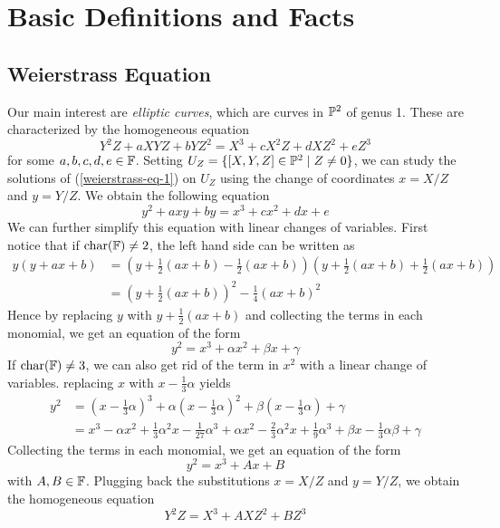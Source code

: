 \section{Basic Definitions and Facts}

\subsection{Weierstrass Equation}

Our main interest are \emph{elliptic curves}, which are curves
in $\mathbb{P}^2$ of genus 1. These are characterized by the
homogeneous equation
\begin{equation}
	\label{weierstrass-eq-1}
	Y^2Z + aXYZ + bYZ^2 = X^3 + cX^2Z + dXZ^2 + eZ^3
\end{equation}
for some $a, b, c, d, e \in \mathbb{F}$.
Setting $U_Z = \{[X, Y, Z] \in \mathbb{P}^2 \mid Z \neq 0\}$, we can
study the solutions of (\ref{weierstrass-eq-1}) on
$U_Z$ using the change of coordinates $x = X/Z$
and $y = Y/Z$. We obtain the following equation
\begin{equation}
	\label{weierstrass-eq-2}
	y^2 + axy + by = x^3 + cx^2 + dx + e
\end{equation}
We can further simplify this equation with linear
changes of variables. First notice that if $\operatorname{char}(\mathbb{F}) \neq 2$,
the left hand side can be
written as
\begin{align*}
	y(y + ax + b) &= (y + \frac{1}{2}(ax + b) - \frac{1}{2}(ax + b))
	(y + \frac{1}{2}(ax + b) + \frac{1}{2}(ax + b))\\
	&= (y + \frac{1}{2}(ax + b))^2 - \frac{1}{4}(ax + b)^2
\end{align*}
Hence by replacing $y$ with $y + \frac{1}{2}(ax + b)$ and
collecting the terms in each monomial, we get an equation
of the form
\begin{equation}
	y^2 = x^3 + \alpha x^2 + \beta x + \gamma
\end{equation}
If $\operatorname{char}(\mathbb{F}) \neq 3$, we can also get rid of the term in 
$x^2$ with a linear change
of variables. replacing $x$ with $x - \frac{1}{3}\alpha$ yields
\begin{align*}
	y^2 &= (x - \frac{1}{3}\alpha)^3 + \alpha(x-\frac{1}{3}\alpha)^2
	+ \beta(x - \frac{1}{3}\alpha) + \gamma\\
	&= x^3 - \alpha x^2 + \frac{1}{3}\alpha^2 x
	- \frac{1}{27}\alpha^3 + \alpha x^2 - \frac{2}{3}\alpha^2 x
	+ \frac{1}{9}\alpha^3 + \beta x - \frac{1}{3}\alpha \beta
	+ \gamma
\end{align*}
Collecting the terms in each monomial, we get an equation of the
form
\begin{equation}
	y^2 = x^3 + Ax + B
\end{equation}
with $A, B \in \mathbb{F}$.
Plugging back the substitutions $x = X/Z$ and $y = Y/Z$, we obtain
the homogeneous equation
\begin{equation}
	Y^2Z = X^3 + AXZ^2 + BZ^3
\end{equation}

